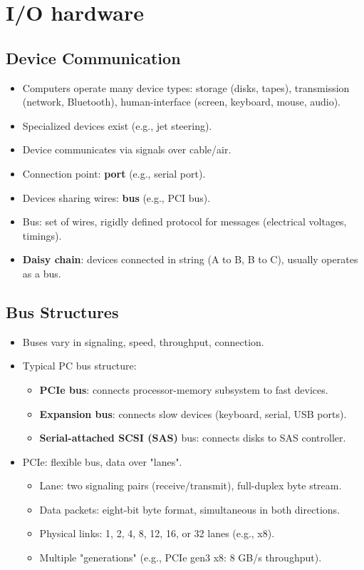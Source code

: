 \section{I/O hardware}

\subsection{Device Communication}
\begin{itemize}
    \item Computers operate many device types: storage (disks, tapes), transmission (network, Bluetooth), human-interface (screen, keyboard, mouse, audio).
    \item Specialized devices exist (e.g., jet steering).
    \item Device communicates via signals over cable/air.
    \item Connection point: \textbf{port} (e.g., serial port).
    \item Devices sharing wires: \textbf{bus} (e.g., PCI bus).
    \item Bus: set of wires, rigidly defined protocol for messages (electrical voltages, timings).
    \item \textbf{Daisy chain}: devices connected in string (A to B, B to C), usually operates as a bus.
\end{itemize}

\subsection{Bus Structures}
\begin{itemize}
    \item Buses vary in signaling, speed, throughput, connection.
    \item Typical PC bus structure:
    \begin{itemize}
        \item \textbf{PCIe bus}: connects processor-memory subsystem to fast devices.
        \item \textbf{Expansion bus}: connects slow devices (keyboard, serial, USB ports).
        \item \textbf{Serial-attached SCSI (SAS)} bus: connects disks to SAS controller.
    \end{itemize}
    \item PCIe: flexible bus, data over "lanes".
    \begin{itemize}
        \item Lane: two signaling pairs (receive/transmit), full-duplex byte stream.
        \item Data packets: eight-bit byte format, simultaneous in both directions.
        \item Physical links: 1, 2, 4, 8, 12, 16, or 32 lanes (e.g., x8).
        \item Multiple "generations" (e.g., PCIe gen3 x8: 8 GB/s throughput).
    \end{itemize}
\end{itemize}

